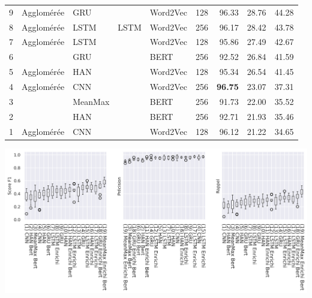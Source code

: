 \begin{minipage}{\linewidth}
{\begin{tabular}{r|lllll|rrr}
         9 &  Agglomérée &      GRU &                &   Word2Vec &            128 &      96.33 &   28.76 &     44.28 \\
         8 &  Agglomérée &     LSTM &           LSTM &   Word2Vec &            256 &      96.17 &   28.42 &     43.78 \\
         7 &  Agglomérée &     LSTM &                &   Word2Vec &            128 &      95.86 &   27.49 &     42.67 \\
         6 &             &      GRU &                &       BERT &            256 &      92.52 &   26.84 &     41.59 \\
         5 &  Agglomérée &      HAN &                &   Word2Vec &            128 &      95.34 &   26.54 &     41.45 \\
         4 &  Agglomérée &      CNN &                &   Word2Vec &            256 &      \textbf{96.75} &   23.07 &     37.31 \\
         3 &             &  MeanMax &                &       BERT &            256 &      91.73 &   22.00 &     35.52 \\
         2 &             &      HAN &                &       BERT &            256 &      92.71 &   21.93 &     35.46 \\
         1 &  Agglomérée &      CNN &                &   Word2Vec &            128 &      96.12 &   21.22 &     34.65 \\
    \bottomrule
    \end{tabular}%
    }
    \label{tab:chap4:metaphor-results}
    \includegraphics[width=\linewidth]{figures/chap4/metaphors-dispersionscores.png}
    \label{fig:chap4:metaphor-results-dispersion}
\end{minipage}

